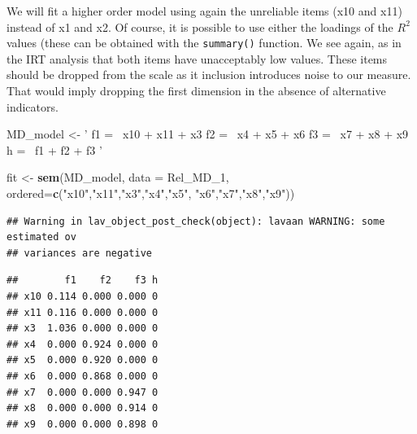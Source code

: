 \documentclass[]{book}
\newenvironment{Shaded}{\begin{snugshade}}{\end{snugshade}}
\newcommand{\DataTypeTok}[1]{\textcolor[rgb]{0.13,0.29,0.53}{#1}}
\newcommand{\DecValTok}[1]{\textcolor[rgb]{0.00,0.00,0.81}{#1}}
\newcommand{\KeywordTok}[1]{\textcolor[rgb]{0.13,0.29,0.53}{\textbf{#1}}}
\newcommand{\NormalTok}[1]{#1}
\newcommand{\OperatorTok}[1]{\textcolor[rgb]{0.81,0.36,0.00}{\textbf{#1}}}
\newcommand{\StringTok}[1]{\textcolor[rgb]{0.31,0.60,0.02}{#1}}
\begin{document}
We will fit a higher order model using again the unreliable items (x10 and x11) instead of x1 and x2. Of course, it is possible to use either the loadings of the \(R^2\) values (these can be obtained with the \texttt{summary()} function. We see again, as in the IRT analysis that both items have unacceptably low values. These items should be dropped from the scale as it inclusion introduces noise to our measure. That would imply dropping the first dimension in the absence of alternative indicators.

\begin{Shaded}
\begin{Highlighting}[]
\NormalTok{ MD_model <-}\StringTok{ ' f1  =~ x10 + x11 + x3}
\StringTok{              f2 =~ x4 + x5 + x6}
\StringTok{              f3   =~ x7 + x8 + x9}
\StringTok{                h =~ f1 + f2 + f3}
\StringTok{ '}

\NormalTok{fit <-}\StringTok{ }\KeywordTok{sem}\NormalTok{(MD_model, }\DataTypeTok{data =}\NormalTok{ Rel_MD_}\DecValTok{1}\NormalTok{,}
           \DataTypeTok{ordered=}\KeywordTok{c}\NormalTok{(}\StringTok{"x10"}\NormalTok{,}\StringTok{"x11"}\NormalTok{,}\StringTok{"x3"}\NormalTok{,}\StringTok{"x4"}\NormalTok{,}\StringTok{"x5"}\NormalTok{,}
                      \StringTok{"x6"}\NormalTok{,}\StringTok{"x7"}\NormalTok{,}\StringTok{"x8"}\NormalTok{,}\StringTok{"x9"}\NormalTok{))}
\end{Highlighting}
\end{Shaded}

\begin{verbatim}
## Warning in lav_object_post_check(object): lavaan WARNING: some estimated ov
## variances are negative
\end{verbatim}

\begin{Shaded}
\end{Shaded}

\begin{verbatim}
##        f1    f2    f3 h
## x10 0.114 0.000 0.000 0
## x11 0.116 0.000 0.000 0
## x3  1.036 0.000 0.000 0
## x4  0.000 0.924 0.000 0
## x5  0.000 0.920 0.000 0
## x6  0.000 0.868 0.000 0
## x7  0.000 0.000 0.947 0
## x8  0.000 0.000 0.914 0
## x9  0.000 0.000 0.898 0
\end{verbatim}
\end{document}
